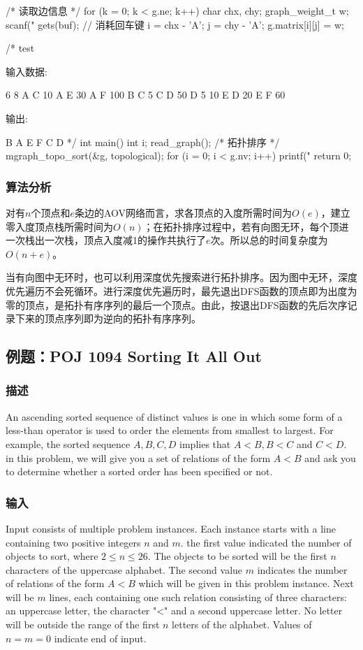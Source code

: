 \begin{Codex}[label=mgraph_topo_sort.c]
{    /* 读取边信息 */
    for (k = 0; k < g.ne; k++) {
        char chx, chy;
        graph_weight_t w;
        scanf("%
        gets(buf); // 消耗回车键
        i = chx - 'A';
        j = chy - 'A';
        g.matrix[i][j] = w;
    }
}

/* test

输入数据:

6 8
A C 10
A E 30
A F 100
B C 5
C D 50
D 5 10
E D 20
E F 60

输出:

B A E F C D
*/
int main() {
    int i;
    read_graph();
    /* 拓扑排序 */
    mgraph_topo_sort(&g, topological);
    for (i = 0; i < g.nv; i++) {
        printf("%
    }
    return 0;
}
\end{Codex}

\subsubsection{算法分析}
对有$n$个顶点和$e$条边的AOV网络而言，求各顶点的入度所需时间为$O(e)$，建立零入度顶点栈所需时间为$O(n)$；在拓扑排序过程中，若有向图无环，每个顶进一次栈出一次栈，顶点入度减1的操作共执行了$e$次。所以总的时间复杂度为$O(n+e)$。

当有向图中无环时，也可以利用深度优先搜索进行拓扑排序。因为图中无环，深度优先遍历不会死循环。进行深度优先遍历时，最先退出DFS函数的顶点即为出度为零的顶点，是拓扑有序序列的最后一个顶点。由此，按退出DFS函数的先后次序记录下来的顶点序列即为逆向的拓扑有序序列。


\subsection{例题：POJ 1094 Sorting It All Out}
\subsubsection{描述}
An ascending sorted sequence of distinct values is one in which some form of a less-than operator is used to order the elements from smallest to largest. For example, the sorted sequence $A, B, C, D$ implies that $A < B, B < C$ and $C < D$. in this problem, we will give you a set of relations of the form $A < B$ and ask you to determine whether a sorted order has been specified or not.

\subsubsection{输入}
Input consists of multiple problem instances. Each instance starts with a line containing two positive integers $n$ and $m$. the first value indicated the number of objects to sort, where $2 \leq n \leq 26$. The objects to be sorted will be the first $n$ characters of the uppercase alphabet. The second value $m$ indicates the number of relations of the form $A < B$ which will be given in this problem instance. Next will be $m$ lines, each containing one such relation consisting of three characters: an uppercase letter, the character "<" and a second uppercase letter. No letter will be outside the range of the first $n$ letters of the alphabet. Values of $n = m = 0$ indicate end of input.

